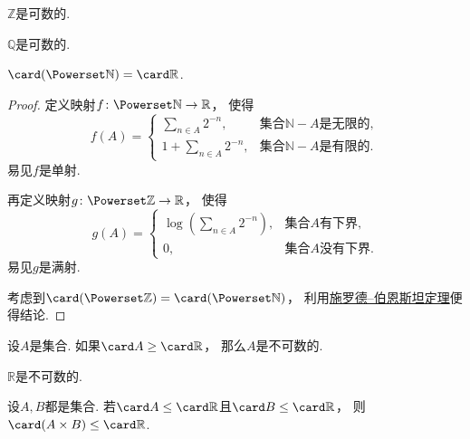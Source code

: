 \begin{corollary}
\(\mathbb{Z}\)是可数的.
\end{corollary}

\begin{corollary}
\(\mathbb{Q}\)是可数的.
\end{corollary}

\begin{proposition}
\(\card(\Powerset\mathbb{N}) = \card\mathbb{R}\).
\begin{proof}
定义映射\(f\colon \Powerset\mathbb{N}\to\mathbb{R}\)，
使得\[
	f(A) = \left\{ \begin{array}{cl}
		\sum_{n \in A} 2^{-n}, & \text{集合$\mathbb{N}-A$是无限的}, \\
		1 + \sum_{n \in A} 2^{-n}, & \text{集合$\mathbb{N}-A$是有限的}.
	\end{array} \right.
\]
易见\(f\)是单射.

再定义映射\(g\colon \Powerset\mathbb{Z}\to\mathbb{R}\)，
使得\[
	g(A) = \left\{ \begin{array}{cl}
		\log\left(\sum_{n \in A} 2^{-n}\right), & \text{集合$A$有下界}, \\
		0, & \text{集合$A$没有下界}.
	\end{array} \right.
\]
易见\(g\)是满射.

考虑到\(\card(\Powerset\mathbb{Z}) = \card(\Powerset\mathbb{N})\)，
利用\hyperref[theorem:集合论.施罗德--伯恩斯坦定理]{施罗德--伯恩斯坦定理}便得结论.
\end{proof}
\end{proposition}

\begin{corollary}
设\(A\)是集合.
如果\(\card A \geq \card\mathbb{R}\)，
那么\(A\)是不可数的.
\end{corollary}

\begin{theorem}
\(\mathbb{R}\)是不可数的.
\end{theorem}

\begin{proposition}
设\(A,B\)都是集合.
若\(\card A \leq \card\mathbb{R}\)且\(\card B \leq \card\mathbb{R}\)，
则\(\card(A \times B) \leq \card\mathbb{R}\).
\end{proposition}

